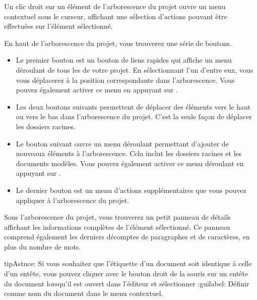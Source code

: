\documentclass[a4paper,11pt,french]{sphinxmanual}
\begin{document}
\sphinxAtStartPar
Un clic droit sur un élément de l’arborescence du projet ouvre un menu contextuel sous le curseur, affichant une sélection d’actions pouvant être effectuées sur l’élément sélectionné.

\sphinxAtStartPar
En haut de l’arborescence du projet, vous trouverez une série de boutons.
\begin{itemize}
\item {} 
\sphinxAtStartPar
Le premier bouton est un bouton de liens rapides qui affiche un menu déroulant de tous les {\hyperref[\detokenize{int_glossary:term-Root-Folder}]{}} de votre projet. En sélectionnant l’un d’entre eux, vous vous déplacerez à la position correspondante dans l’arborescence. Vous pouvez également activer ce menu en appuyant sur .

\item {} 
\sphinxAtStartPar
Les deux boutons suivants permettent de déplacer des éléments vers le haut ou vers le bas dans l’arborescence du projet. C’est la seule façon de déplacer les dossiers racines.

\item {} 
\sphinxAtStartPar
Le bouton suivant ouvre un menu déroulant permettant d’ajouter de nouveaux éléments à l’arborescence. Cela inclut les dossiers racines et les documents modèles. Vous pouvez également activer ce menu déroulant en appuyant sur .

\item {} 
\sphinxAtStartPar
Le dernier bouton est un menu d’actions supplémentaires que vous pouvez appliquer à l’arborescence du projet.

\end{itemize}

\sphinxAtStartPar
Sous l’arborescence du projet, vous trouverez un petit panneau de détails affichant les informations complètes de l’élément sélectionné. Ce panneau comprend également les derniers décomptes de paragraphes et de caractères, en plus du nombre de mots.

\begin{sphinxadmonition}{tip}{Astuce:}
\sphinxAtStartPar
Si vous souhaitez que l’étiquette d’un document soit identique à celle d’un en\sphinxhyphen{}tête, vous pouvez cliquer avec le bouton droit de la souris sur un en\sphinxhyphen{}tête du document lorsqu’il est ouvert dans l’éditeur et sélectionner :guilabel:\textasciigrave{} Définir comme nom du document\textasciigrave{} dans le menu contextuel.
\end{sphinxadmonition}
\end{document}
